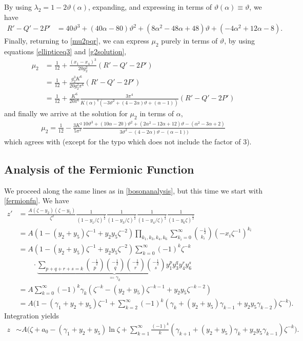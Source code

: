 \documentclass[10pt]{article}
\theoremstyle{plain}
\theoremstyle{definition}
\theoremstyle{plain}
\begin{document}
By using $\lambda_2 = 1-2\vartheta(\alpha)$, expanding, and expressing in terms of $\vartheta(\alpha)\equiv\vartheta$, we have
\begin{align*}
	R'-Q'-2P' &= 40\vartheta^3 + (40\alpha-80)\vartheta^2 + (8\alpha^2 - 48\alpha + 48)\vartheta + (-4\alpha^2+12\alpha-8).
\end{align*}
Finally, returning to \ref{mu2pqr}, we can express $\mu_2$ purely in terms of $\vartheta$, by using equations \ref{ellipticeq3} and \ref{g2solution},
\begin{align*}
	\mu_2 &= \frac{1}{12} + \frac{(x_1-x_4)^3}{20g_2^2}(R'-Q'-2P') \\
	&= \frac{1}{12} + \frac{g_2^3 K^6}{20g_2^2\pi^6}(R'-Q'-2P') \\
	&= \frac{1}{12} + \frac{K^6}{20\pi^6}\frac{3\pi^4}{K(\alpha)^4(-3\vartheta^2+(4-2\alpha)\vartheta+(\alpha-1))}(R'-Q'-2P') 
\end{align*}
and finally we arrive at the solution for $\mu_2$ in terms of $\alpha$,
\begin{align}
	\boxed{\mu_2 = \frac{1}{12} - \frac{3K^2}{5\pi^2}\frac{10\vartheta^3 + (10\alpha-20)\vartheta^2+(2\alpha^2-12\alpha+12)\vartheta -(\alpha^2-3\alpha+2)}{3\vartheta^2-(4-2\alpha)\vartheta-(\alpha-1))}} \label{mu2solution}
\end{align}
which agrees with \cite{kazakov1999d} (except for the typo which does not include the factor of 3).

\subsection{Analysis of the Fermionic Function}\label{fermionanalysis}

We proceed along the same lines as in \ref{bosonanalysis}, but this time we start with \ref{fermionfn}. We have
\begin{align*}
	z' &= \frac{A(\zeta - y_2)(\zeta - y_5)}{\zeta^2} \frac{1}{(1-y_1/\zeta)^\frac{1}{2}}\frac{1}{(1-y_3/\zeta)^\frac{1}{2}}\frac{1}{(1-y_4/\zeta)^{\frac{1}{2}}}\frac{1}{(1-y_6\zeta)^{\frac{1}{2}}} \\
	&= A(1- (y_2+y_5)\zeta^{-1}+y_2y_5\zeta^{-2})\prod_{k_1,k_3,k_4,k_6} \sum_{k_i=0}^\infty {-\frac{1}{2}\choose k_i}(-x_i\zeta^{-1})^{k_i} \\
	&= A(1- (y_2+y_5)\zeta^{-1}+y_2y_5\zeta^{-2})\sum_{k=0}^\infty (-1)^k\zeta^{-k}\\&\qquad \cdot \underbrace{\sum_{p+q+r+s=k} {-\frac{1}{2}\choose p}{-\frac{1}{2}\choose q}{-\frac{1}{2}\choose r}{-\frac{1}{2}\choose s}y_1^py_3^qy_4^ry_6^s }_{\eqqcolon \gamma_k}\\
	&= A\sum_{k=0}^\infty (-1)^k\gamma_k(\zeta^{-k}-(y_2+y_5)\zeta^{-k-1}+y_2y_5\zeta^{-k-2}) \\
	&= A\bigg( 1 - (\gamma_1 + y_2 + y_5)\zeta^{-1} +\sum_{k=2}^\infty (-1)^k(\gamma_k + (y_2+y_5)\gamma_{k-1} +y_2y_5\gamma_{k-2})\zeta^{-k}\bigg).
\end{align*}
Integration yields
\begin{align}
	z&\sim A\bigg(\zeta + a_0 - (\gamma_1+y_2+y_5)\ln \zeta +\sum_{k=1}^\infty \frac{(-1)^{k}}{k}(\gamma_{k+1} + (y_2+y_5)\gamma_{k} +y_2y_5\gamma_{k-1})\zeta^{-k}  \bigg).\label{fermionz}
\end{align}
\end{document}
